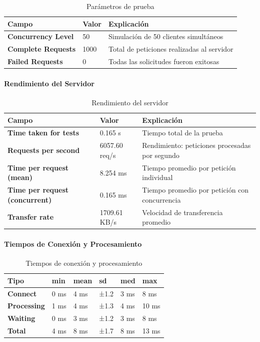 \begin{table}[H]
\centering
\begin{tabular}{|p{5cm}|p{5cm}|p{5cm}|}
\hline
\textbf{Campo} & \textbf{Valor} & \textbf{Explicación} \\ \hline
\textbf{Concurrency Level} & 50 & Simulación de 50 clientes simultáneos \\ \hline
\textbf{Complete Requests} & 1000 & Total de peticiones realizadas al servidor \\ \hline
\textbf{Failed Requests} & 0 & Todas las solicitudes fueron exitosas \\ \hline
\end{tabular}
\caption{Parámetros de prueba}
\end{table}

\paragraph{Rendimiento del Servidor}

\begin{table}[H]
\centering
\begin{tabular}{|p{5cm}|p{5cm}|p{5cm}|}
\hline
\textbf{Campo} & \textbf{Valor} & \textbf{Explicación} \\ \hline
\textbf{Time taken for tests} & 0.165 s & Tiempo total de la prueba \\ \hline
\textbf{Requests per second} & 6057.60 req/s & Rendimiento: peticiones procesadas por segundo \\ \hline
\textbf{Time per request (mean)} & 8.254 ms & Tiempo promedio por petición individual \\ \hline
\textbf{Time per request (concurrent)} & 0.165 ms & Tiempo promedio por petición con concurrencia \\ \hline
\textbf{Transfer rate} & 1709.61 KB/s & Velocidad de transferencia promedio \\ \hline
\end{tabular}
\caption{Rendimiento del servidor}
\end{table}

\paragraph{Tiempos de Conexión y Procesamiento}

\begin{table}[H]
\centering
\begin{tabular}{|p{2cm}|p{2cm}|p{2cm}|p{2cm}|p{2cm}|p{2cm}|}
\hline
\textbf{Tipo} & \textbf{min} & \textbf{mean} & \textbf{sd} & \textbf{med} & \textbf{max} \\ \hline
\textbf{Connect} & 0 ms & 4 ms & ±1.2 & 3 ms & 8 ms \\ \hline
\textbf{Processing} & 1 ms & 4 ms & ±1.3 & 4 ms & 10 ms \\ \hline
\textbf{Waiting} & 0 ms & 3 ms & ±1.2 & 3 ms & 8 ms \\ \hline
\textbf{Total} & 4 ms & 8 ms & ±1.7 & 8 ms & 13 ms \\ \hline
\end{tabular}
\caption{Tiempos de conexión y procesamiento}
\end{table}

